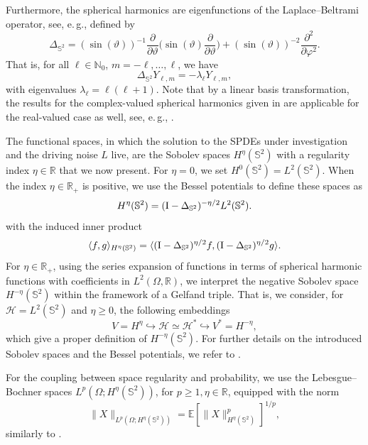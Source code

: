 \documentclass[11pt]{amsart}
\newcommand{\R}{{\mathbb R}}
\newcommand{\N}{{\mathbb N}}
\newcommand{\IS}{\mathbb{S}}
\newcommand{\Id}{\text I}
\newcommand{\Deltalb}{\Delta_{\IS^2}}
\begin{document}
Furthermore, the spherical harmonics are eigenfunctions of  the Laplace--Beltrami operator, see, e.\,g., \cite[Chapter 6]{byerly1893elementary}
defined by 
\begin{equation*}%
    \Deltalb = (\sin(\vartheta))^{-1} \frac{\partial}{\partial \vartheta}\Big(\sin(\vartheta)\frac{\partial}{\partial \vartheta} \Big) +  (\sin(\vartheta))^{-2} \frac{\partial^2}{\partial \varphi^2}.    
\end{equation*}
That is, for all $\ell\in\N_0$, $m=-\ell,\ldots,\ell$, we have
\begin{equation*}%
    \Deltalb Y_{\ell,m}
    = -\lambda_\ell Y_{\ell, m},
\end{equation*}
with eigenvalues $\lambda_\ell = \ell(\ell+1)$.
Note that by a linear basis transformation, the results for the complex-valued spherical harmonics given in \cite{marinucciRandomFieldsSphere2011a} are applicable for the real-valued case as well, see, e.\,g., \cite[Appendix A]{janssonNonstationaryGaussianRandom2024}.

The functional spaces, in which the solution to the SPDEs under investigation and the driving noise $L$ live,
are the Sobolev spaces $H^\eta(\IS^2)$ with a regularity index $\eta\in\R$ that we now present. For $\eta=0$, we set $H^0(\mathbb{S}^2)=L^2(\mathbb{S}^2)$. When the index $\eta\in\R_+$ is positive, we use the Bessel potentials to define these spaces as
\begin{equation*}%
    H^\eta(\IS^2) = (\Id-\Deltalb)^{-\eta/2}L^2(\IS^2).
\end{equation*}
with the induced inner product
\begin{equation*}
    \langle f, g \rangle_{H^\eta(\IS^2)} = \langle (\Id-\Deltalb)^{\eta/2}f,(\Id-\Deltalb)^{\eta/2} g \rangle.
\end{equation*} 
For $\eta \in \R_+$, using the series expansion of functions in terms of spherical harmonic functions with coefficients in $L^2(\Omega, \R)$, we interpret the negative Sobolev space $H^{-\eta}(\IS^2)$ within the framework of a Gelfand triple. That is, we consider, for $\mathcal{H}=L^2(\IS^2)$ and $\eta\geq0$, the following embeddings
$$
V=H^\eta \hookrightarrow \mathcal{H}\simeq \mathcal{H}^*\hookrightarrow V^* = H^{-\eta},
$$
which give a proper definition of $H^{-\eta}(\IS^2)$. For further details on the introduced Sobolev spaces and the Bessel potentials, we refer to \cite{AnMan}.

For the coupling between space regularity and probability, we use the Lebesgue--Bochner spaces $L^p(\Omega;H^\eta(\IS^2))$, for $p\geq1, \eta\in \R$, equipped with the norm
$$
\|X\|_{L^p(\Omega;H^\eta(\IS^2))}=\mathbb{E}[\|X\|^p_{H^\eta(\IS^2)}]^{1/p},
$$
similarly to \cite{papi2025,MR3404631}.
\end{document}
